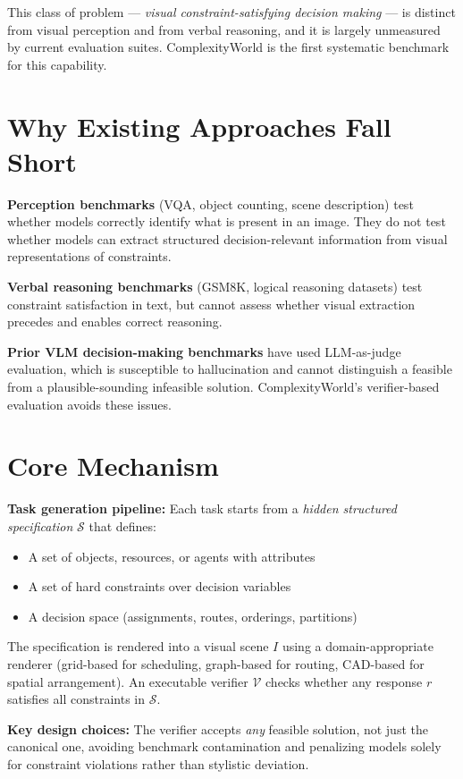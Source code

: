 \documentclass[10pt,twocolumn]{article}
\begin{document}
This class of problem --- \emph{visual constraint-satisfying decision
making} --- is distinct from visual perception and from verbal
reasoning, and it is largely unmeasured by current evaluation suites.
ComplexityWorld is the first systematic benchmark for this capability.

\section{Why Existing Approaches Fall Short}

\textbf{Perception benchmarks} (VQA, object counting, scene
description) test whether models correctly identify what is present
in an image. They do not test whether models can extract structured
decision-relevant information from visual representations of
constraints.

\textbf{Verbal reasoning benchmarks} (GSM8K, logical reasoning
datasets) test constraint satisfaction in text, but cannot assess
whether visual extraction precedes and enables correct reasoning.

\textbf{Prior VLM decision-making benchmarks} have used LLM-as-judge
evaluation, which is susceptible to hallucination and cannot
distinguish a feasible from a plausible-sounding infeasible solution.
ComplexityWorld's verifier-based evaluation avoids these issues.

\section{Core Mechanism}

\textbf{Task generation pipeline:} Each task starts from a
\emph{hidden structured specification} $\mathcal{S}$ that defines:
\begin{itemize}[itemsep=1pt,parsep=0pt]
  \item A set of objects, resources, or agents with attributes
  \item A set of hard constraints over decision variables
  \item A decision space (assignments, routes, orderings, partitions)
\end{itemize}
The specification is rendered into a visual scene $I$ using a
domain-appropriate renderer (grid-based for scheduling, graph-based
for routing, CAD-based for spatial arrangement). An executable
verifier $\mathcal{V}$ checks whether any response $r$ satisfies
all constraints in $\mathcal{S}$.

\textbf{Key design choices:}
The verifier accepts \emph{any} feasible solution, not just the
canonical one, avoiding benchmark contamination and penalizing models
solely for constraint violations rather than stylistic deviation.
\end{document}
